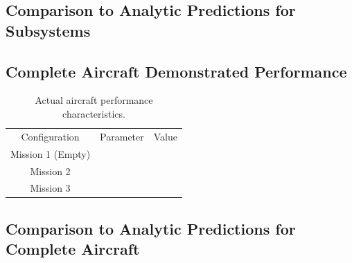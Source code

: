 \documentclass[report]{byu-aero}
\begin{document}
\subsection{Comparison to Analytic Predictions for Subsystems}

\subsection{Complete Aircraft Demonstrated Performance}

\begin{table}[h!]
	\centering
	\caption{Actual aircraft performance characteristics.}
	\label{tab:actualaircraftperformance}
	\begin{tabular}{ c c c } 

		\rowcolor{BYUbluemid}
		Configuration & Parameter & Value \\

		Mission 1 (Empty) &  &  \\

		Mission 2 &  &  \\

		Mission 3 &  &  \\

	\end{tabular}
\end{table}

\subsection{Comparison to Analytic Predictions for Complete Aircraft}



{}

\end{document}
